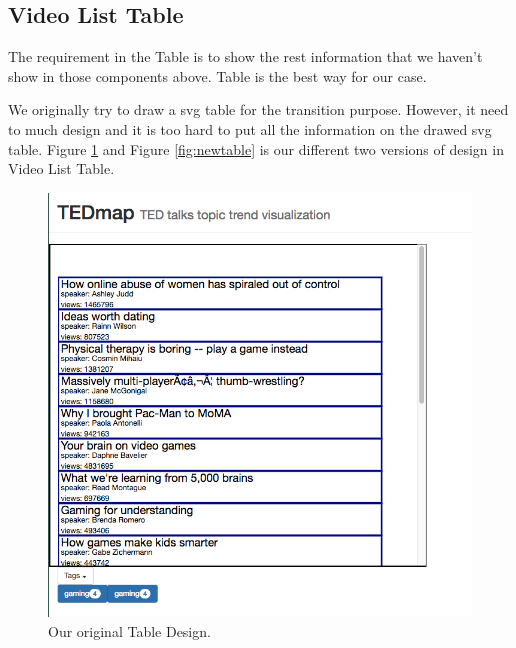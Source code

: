 \documentclass{report}
\numberwithin{figure}{section}
\begin{document}
\subsection{Video List Table}

\quad The requirement in the Table is to show the rest information that we haven't  show  in those components above. Table is the best way for our case. 

We originally try to draw a svg table for the transition purpose. However, it need to much design and it is too hard to put all the information on the drawed svg table. Figure \ref{fig:oldtable} and Figure \ref{fig:newtable} is our different two versions of design in Video List Table.



\begin{figure}
\begin{center}
\includegraphics[scale=0.2]{table}
\caption{Our original Table Design.}
\label{fig:oldtable}
\end{center}
\end{figure} 
\end{document}
